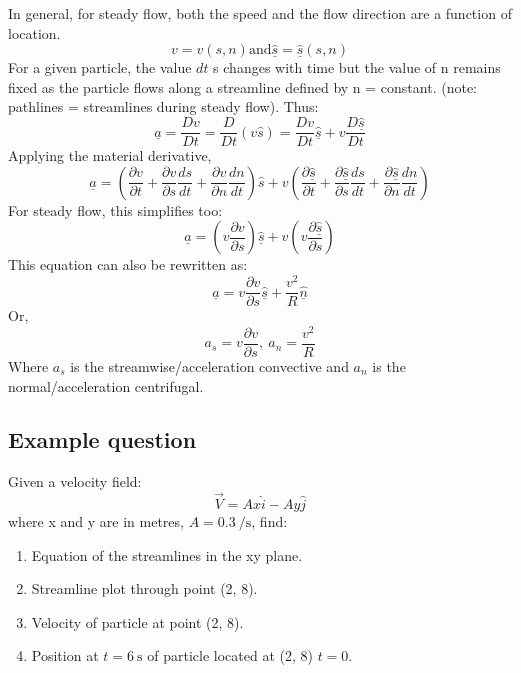 \documentclass[class=report, crop=false, 12pt,a4paper]{standalone}
\begin{document}
In general, for steady flow, both the speed and the flow direction are a function of location.
\begin{equation} 
  v = v(s, n) \textrm{and} \underline{\hat{s}} = \underline{\hat{s}}(s, n)
\end{equation}
For a given particle, the value \(dt \) s changes with time but the value of n remains fixed as the particle flows along a streamline defined by n = constant. (note: pathlines = streamlines during steady flow). Thus: 
\begin{equation} 
  \underline{a} = \frac{Dv}{Dt} = \frac{D}{Dt}(v\hat{s}) = \frac{Dv}{Dt}\underline{\hat{s}} + v \frac{D\underline{\hat{s}}}{Dt}
\end{equation}
Applying the material derivative,
\begin{equation}
  \underline{a} = \left( \frac{\partial v}{\partial t} + \frac{\partial v}{\partial s}\frac{ds}{dt} + \frac{\partial v}{\partial n}\frac{dn}{dt} \right) \hat{s} + v \left( \frac{\partial \underline{\hat{s}}}{\partial t} + \frac{\partial \underline{\hat{s}}}{\partial s}\frac{ds}{dt} + \frac{\partial \underline{\hat{s}}}{\partial n}\frac{dn}{dt} \right)
\end{equation}
For steady flow, this simplifies too:
\begin{equation} 
  \underline{a} = \left( v\frac{\partial v}{\partial s} \right) \underline{\hat{s}} + v \left( v\frac{\partial \underline{\hat{s}}}{\partial s} \right)
\end{equation}
This equation can also be rewritten as:
\begin{equation} 
  \underline{a} = v\frac{\partial v}{\partial s} \underline{\hat{s}} + \frac{v^2}{R} \underline{\hat{n}}
\end{equation}
Or,
\begin{equation} 
  a_s = v\frac{\partial v}{\partial s}, \ a_n = \frac{v^2}{R} 
\end{equation}
Where \(a_s\) is the streamwise/acceleration convective and \(a_n\) is the normal/acceleration centrifugal.
\subsection{Example question}
Given a velocity field:
\begin{equation}
  \vec{V} = Ax\hat{i} - Ay\hat{j}
\end{equation}
where x and y are in metres, $A = 0.3 \ \si{\per\second}$, find:
\begin{enumerate}[noitemsep]
  \item Equation of the streamlines in the xy plane.
  \item Streamline plot through point (2, 8).
  \item Velocity of particle at point (2, 8).
  \item Position at $t = 6 \ \si{\second}$ of particle located at (2, 8) $t =0$.
\end{enumerate}
\end{document}
